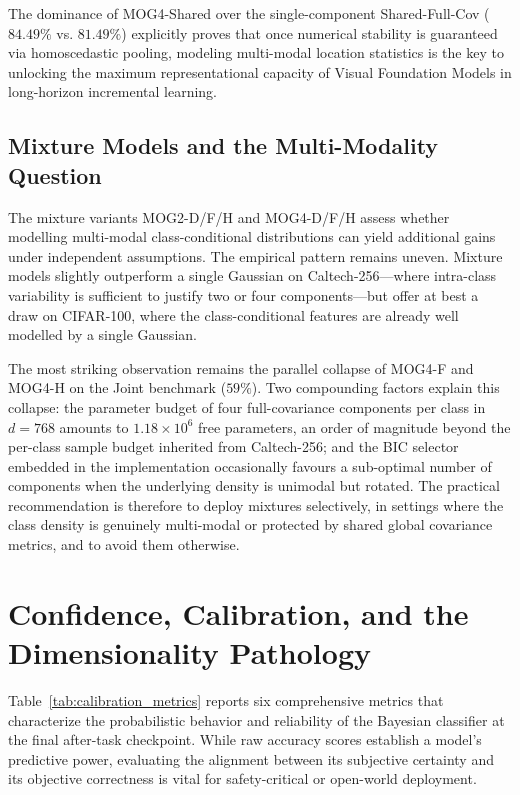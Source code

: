 The dominance of MOG4-Shared over the single-component Shared-Full-Cov ($84.49\%$ vs. $81.49\%$) explicitly proves that once numerical stability is guaranteed via homoscedastic pooling, modeling multi-modal location statistics is the key to unlocking the maximum representational capacity of Visual Foundation Models in long-horizon incremental learning.

\subsection{Mixture Models and the Multi-Modality Question}
\label{sec:an:mog_extended}

The mixture variants MOG2-D/F/H and MOG4-D/F/H assess whether modelling multi-modal class-conditional distributions can yield additional gains under independent assumptions. The empirical pattern remains uneven. Mixture models slightly outperform a single Gaussian on Caltech-256---where intra-class variability is sufficient to justify two or four components---but offer at best a draw on CIFAR-100, where the class-conditional features are already well modelled by a single Gaussian. 

The most striking observation remains the parallel collapse of MOG4-F and MOG4-H on the Joint benchmark ($59\%$). Two compounding factors explain this collapse: the parameter budget of four full-covariance components per class in $d=768$ amounts to $1.18\times 10^{6}$ free parameters, an order of magnitude beyond the per-class sample budget inherited from Caltech-256; and the BIC selector embedded in the implementation occasionally favours a sub-optimal number of components when the underlying density is unimodal but rotated. The practical recommendation is therefore to deploy mixtures selectively, in settings where the class density is genuinely multi-modal or protected by shared global covariance metrics, and to avoid them otherwise.


\section{Confidence, Calibration, and the Dimensionality Pathology}
\label{sec:calibration_results_section}

Table~\ref{tab:calibration_metrics} reports six comprehensive metrics that characterize the probabilistic behavior and reliability of the Bayesian classifier at the final after-task checkpoint. While raw accuracy scores establish a model's predictive power, evaluating the alignment between its subjective certainty and its objective correctness is vital for safety-critical or open-world deployment.

